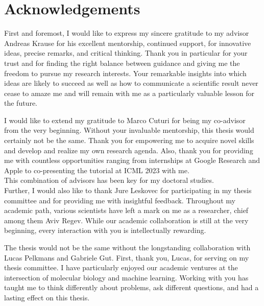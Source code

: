 
\bigskip

\begingroup
\let\clearpage\relax
\let\cleardoublepage\relax
\let\cleardoublepage\relax
\chapter*{Acknowledgements}

\def\thanks#1{%
\begingroup
\leftskip1em
\noindent #1
\par
\endgroup
}

First and foremost, I would like to express my sincere gratitude to my advisor Andreas Krause for his excellent mentorship, continued support, for innovative ideas, precise remarks, and critical thinking.
Thank you in particular for your trust and for finding the right balance between guidance and giving me the freedom to pursue my research interests.
Your remarkable insights into which ideas are likely to succeed as well as how to communicate a scientific result never cease to amaze me and will remain with me as a particularly valuable lesson for the future.

I would like to extend my gratitude to Marco Cuturi for being my co-advisor from the very beginning. 
Without your invaluable mentorship, this thesis would certainly not be the same. Thank you for empowering me to acquire novel skills and develop and realize my own research agenda.
Also, thank you for providing me with countless opportunities ranging from internships at Google Research and Apple to co-presenting the tutorial at ICML 2023 with me. \\
This combination of advisors has been key for my doctoral studies. \\

Further, I would also like to thank Jure Leskovec for participating in my thesis committee and for providing me with insightful feedback. 
Throughout my academic path, various scientists have left a mark on me as a researcher, chief among them Aviv Regev. While our academic collaboration is still at the very beginning, every interaction with you is intellectually rewarding.

 The thesis would not be the same without the longstanding collaboration with Lucas Pelkmans and Gabriele Gut. First, thank you, Lucas, for serving on my thesis committee.
I have particularly enjoyed our academic ventures at the intersection  of molecular biology and machine learning. Working with you has taught me to think differently about problems, ask different questions, and had a lasting effect on this thesis.

